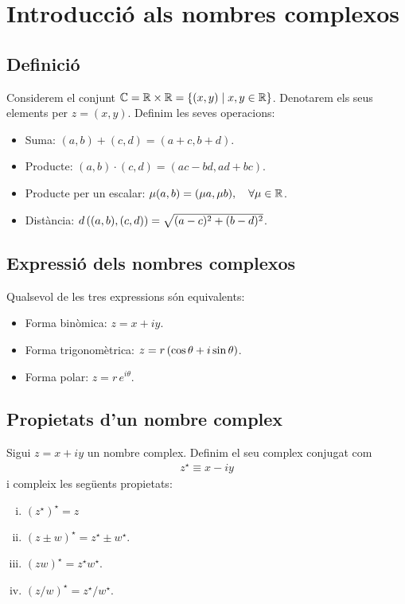 \section{Introducció als nombres complexos}
\subsection{Definició}
Considerem el conjunt $\mathbb{C} = \mathbb{R} \times \mathbb{R} = \left\{ (x,y) \mid x, y \in \mathbb{R} \right\}$. Denotarem els seus elements per $z = (x,y)$. Definim les seves operacions:
\begin{itemize}
    \item Suma: $(a,b) + (c,d) = (a+c, b+d)$.
    \item Producte: $(a,b) \cdot (c,d) = (ac - bd, ad +bc)$.
    \item Producte per un escalar: $\mu (a,b) = (\mu a, \mu b), \quad \forall \mu \in \mathbb{R}$.
    \item Distància: $d\left( (a,b), (c,d) \right) = \sqrt{(a-c)^{2} + (b-d)^{2}}$.
\end{itemize}

\subsection{Expressió dels nombres complexos}
Qualsevol de les tres expressions són equivalents:
\begin{itemize}
    \item Forma binòmica: $z = x + iy$.
    \item Forma trigonomètrica: $z = r \left( \cos \theta + i \sin \theta \right)$.
    \item Forma polar: $z = r\,e^{i\theta}$.
\end{itemize}

\subsection{Propietats d'un nombre complex}
\begin{defi}[Conjugat de $z$]
    Sigui $z = x + i y$ un nombre complex. Definim el seu complex conjugat com 
    \begin{align}
        z^{\star} \equiv x - iy
    \end{align}
    i compleix les següents propietats:
    \begin{enumerate}[i)]
        \item $(z^{\star})^{\star} = z$
        \item $(z\pm w)^{\star} = z^{\star} \pm w^{\star}$.
        \item $(z w)^{\star} = z^{\star} w^{\star}$.
        \item $(z / w)^{\star} = z^{\star} / w^{\star}$.
    \end{enumerate}
\end{defi}


